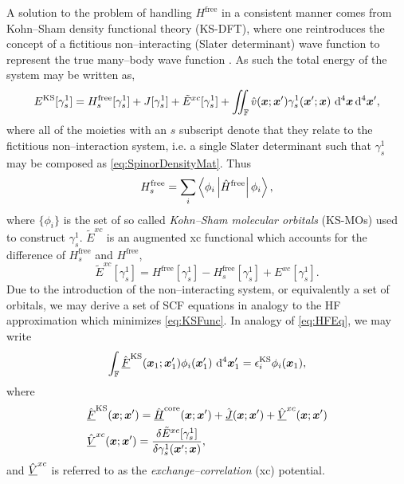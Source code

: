 A solution to the problem of handling $H^\mathrm{free}$ in a consistent manner
comes from Kohn--Sham density functional theory (KS-DFT), where one
reintroduces the concept of a fictitious non--interacting (Slater determinant)
wave function to represent the true many--body wave function . As
such the total energy of the system may be written as,
\begin{equation}
  \label{eq:KSFunc}
  E^{\mathrm{KS}}[\gamma_s^1] = H_s^\mathrm{free}[\gamma_s^1] + J[\gamma_s^1] + \tilde E^{xc}[\gamma_s^1] + 
    \int\mkern-12mu\int_\mathbb{F} \hat{v}(\boldsymbol{x};\boldsymbol{x}') \gamma_s^1(\boldsymbol{x}'; \boldsymbol{x})\, \,\mathrm{d}^4\boldsymbol{x}\,\mathrm{d}^4\boldsymbol{x}',
\end{equation}
where all of the moieties with an $s$ subscript denote that they relate to the
fictitious non--interaction system, i.e. a single Slater determinant such that
$\gamma^1_s$ may be composed as \cref{eq:SpinorDensityMat}. Thus
\begin{equation}
  H^\mathrm{free}_s = \sum_i \left\langle \phi_i \left\vert \hat{H}^\mathrm{free} \right\vert \phi_i \right\rangle,
\end{equation}
where $\{\phi_i\}$ is the set of so called \emph{Kohn--Sham molecular orbitals} (KS-MOs) used to construct $\gamma^1_s$.
$\tilde E^{xc}$ is an augmented xc functional which accounts for the difference
of $H_s^\mathrm{free}$ and $H^\mathrm{free}$,
\begin{equation}
  \tilde E^{xc}[\gamma^1_s] = H^\mathrm{free}[\gamma^1_s] - H_s^\mathrm{free}[\gamma^1_s] + E^{xc}[\gamma^1_s].
\end{equation}
Due to the introduction of the non--interacting system, or equivalently a set of orbitals,
we may derive a set of SCF equations in analogy to the HF approximation which minimizes \cref{eq:KSFunc}.
In analogy of \cref{eq:HFEq}, we may write
\begin{equation}
  \label{eq:KSEqCan}
  \int_{\mathbb F} \hat{\underline{F}}^{\mathrm{KS}}(\boldsymbol{x}_1; \boldsymbol{x}_1') \phi_i(\boldsymbol{x}_1') \,\,\mathrm{d}^4\boldsymbol{x}'_1 = 
    \epsilon^{\mathrm{KS}}_i \phi_i(\boldsymbol{x}_1), 
\end{equation}
where
\begin{align}
  \label{eq:KSFockSpace}
  &\hat{\underline{F}}^{\mathrm{KS}}(\boldsymbol{x}; \boldsymbol{x}') = 
    \hat{\underline{H}}^\mathrm{core}(\boldsymbol{x}; \boldsymbol{x}') + \hat{\underline{J}}(\boldsymbol{x}; \boldsymbol{x}') +
    \hat{\underline{V}}^{xc}(\boldsymbol{x}; \boldsymbol{x}') \\
  &\hat{\underline{V}}^{xc}(\boldsymbol{x}; \boldsymbol{x}') = \frac{\delta \tilde E^{xc}[\gamma^1_s]}{\delta \gamma^1_s(\boldsymbol{x}';\boldsymbol{x})},
\end{align}
and $\hat{\underline{V}}^{xc}$ is referred to as the \emph{exchange--correlation} (xc) potential. 
